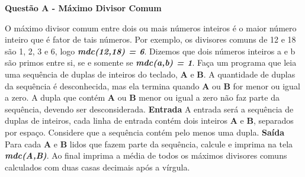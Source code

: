 \documentclass[a4paper, 12pt]{article}
\begin{document}
\newpage %
\begin{center}
\textbf{{\Large Questão A - Máximo Divisor Comum}}
\end{center}
\vspace{5pt}
O máximo divisor comum entre dois ou mais números inteiros é o maior número inteiro que é fator de tais números. Por exemplo, os divisores comuns de 12 e 18 são 1, 2, 3 e 6, logo \textbf{\textit{mdc(12,18) = 6}}. Dizemos que dois números inteiros a e b são primos entre si, se e somente se \textbf{\textit{mdc(a,b) = 1}}. Faça um programa que leia uma sequência de duplas de inteiros do teclado, \textbf{A} e \textbf{B}. A quantidade de duplas da sequência é desconhecida, mas ela termina quando \textbf{A} ou \textbf{B} for menor ou igual a zero. A dupla que contém \textbf{A} ou \textbf{B} menor ou igual a zero não faz parte da sequência, devendo ser desconsiderada.
\newline \newline
\textbf{{\large Entrada}} \newline
A entrada será a sequência de duplas de inteiros, cada linha de entrada contém dois inteiros \textbf{A} e \textbf{B}, separados por espaço. Considere que a sequência contém pelo menos uma dupla.
\newline \newline
\textbf{{\large Saída}} \newline
Para cada \textbf{A} e \textbf{B} lidos que fazem parte da sequência, calcule e imprima na tela \textbf{\textit{mdc(A,B)}}. Ao final imprima a média de todos os máximos divisores comuns calculados com duas casas decimais após a vírgula.
\newline
\end{document}
